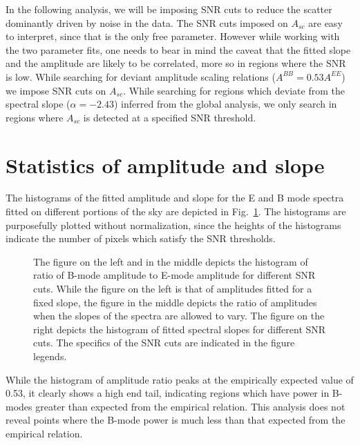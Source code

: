 \documentclass[12pt]{article}
\begin{document}
In the following analysis, we will be imposing SNR cuts to reduce the scatter dominantly driven by noise in the data. The SNR cuts imposed on $A_{sc}$ are easy to interpret, since that is the only free parameter. However while working with the two parameter fits, one needs to bear in mind the caveat that the fitted slope and the amplitude are likely to be correlated, more so in regions where the SNR is low. While searching for deviant amplitude scaling relations ($A^{BB} = 0.53 A^{EE}$)  we impose SNR cuts on $A_{sc}$. While searching for regions which deviate from the spectral slope ($\alpha=-2.43$) inferred from the global analysis, we only search in regions where $A_{sc}$ is detected at a specified SNR threshold.

\section{Statistics of amplitude and slope}

The histograms of the fitted amplitude and slope for the E and B mode spectra fitted on different portions of the sky are depicted in Fig.~\ref{fig:amp_slope_stats}. The histograms are purposefully plotted without normalization, since the heights of the histograms indicate the number of pixels which satisfy the SNR thresholds. 
\begin{figure}[!h]
\centering
{}
\caption{The figure on the left and in the middle depicts the histogram of ratio of B-mode amplitude to E-mode amplitude for different SNR cuts. While the figure on the left is that of amplitudes fitted for a fixed slope, the figure in the middle depicts the ratio of amplitudes when the slopes of the spectra are allowed to vary. The figure on the right depicts the histogram of fitted spectral slopes for different SNR cuts. The specifics of the SNR cuts are indicated in the figure legends.}
\label{fig:amp_slope_stats}
\end{figure}

While the histogram of amplitude ratio peaks at the empirically expected value of 0.53, it clearly shows a high end tail, indicating regions which have power in B-modes greater than expected from the empirical relation. This analysis does not reveal points where the B-mode power is much less than that expected from the empirical relation.  
 
\end{document}

